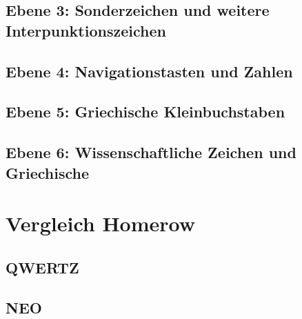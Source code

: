 \documentclass{beamer}
\begin{document}
\subsection{Ebene 3: Sonderzeichen und weitere Interpunktionszeichen}

\subsection{Ebene 4: Navigationstasten und Zahlen}

\subsection{Ebene 5: Griechische Kleinbuchstaben}

\subsection{Ebene 6: Wissenschaftliche Zeichen und Griechische}

\section{Vergleich Homerow}

\subsection{QWERTZ}
\frame{ 
  
}
\subsection{NEO}
\frame{
  
}
\end{document}
